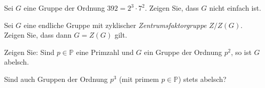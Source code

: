 \begin{Problem}
	Sei $G$ eine Gruppe der Ordnung $392=2^3\cdot 7^2$. Zeigen Sie, dass $G$ nicht einfach ist.
\end{Problem}

\begin{Problem}
	\begin{parts}
	\item Sei $G$ eine endliche Gruppe mit zyklischer \emph{Zentrumsfaktorgruppe} $Z / Z(G)$. Zeigen Sie, dass dann $G=Z(G)$ gilt.
	\item Zeigen Sie: Sind $p\in \mathbb{P}$ eine Primzahl und $G$ ein Gruppe der Ordnung $p^2$, so ist $G$ abelsch.
	\item Sind auch Gruppen der Ordnung $p^3$ (mit primem $p\in \mathbb{P}$) stets abelsch?
	\end{parts}
\end{Problem}
